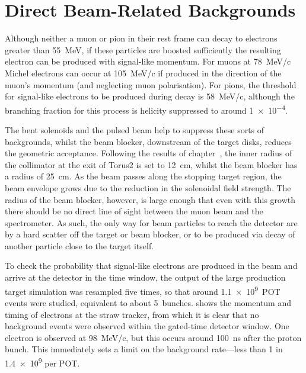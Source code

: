 \section{Direct Beam-Related Backgrounds}
Although neither a muon or pion in their rest frame can decay to electrons greater than 55~MeV, if these particles are boosted sufficiently the resulting electron can be produced with signal-like momentum.
For muons at 78~MeV/c Michel electrons can occur at 105~MeV/c if produced in the direction of the muon's momentum (and neglecting muon polarisation).
For pions, the threshold for signal-like electrons to be produced during decay is 58~MeV/c, although the branching fraction for this process is helicity suppressed to around \num{1e-4}.

The bent solenoids and the pulsed beam help to suppress these sorts of backgrounds, whilst the beam blocker, downstream of the target disks, reduces the geometric acceptance.
Following the results of chapter~, the inner radius of the collimator at the exit of Torus2 is set to 12~cm, whilst the beam blocker has a radius of 25~cm. 
As the beam passes along the stopping target region, the beam envelope grows due to the reduction in the solenoidal field strength.
The radius of the beam blocker, however, is large enough that even with this growth there should be no direct line of sight between the muon beam and the spectrometer.
As such, the only way for beam particles to reach the detector are by a hard scatter off the target or beam blocker, or to be produced via decay of another particle close to the target itself.

To check the probability that signal-like electrons are produced in the beam and arrive at the detector in the time window,
the output of the large production target simulation was resampled five times, so that around \num{1.1e9}~\ac{POT} events were studied, equivalent to about 5~\phaseII bunches.
 shows the momentum and timing of electrons at the straw tracker, from which it is clear that no background events were observed within the gated-time detector window.
One electron is observed at 98~MeV/c, but this occurs around 100~ns after the proton bunch.
This immediately sets a limit on the background rate---less than 1 in \num{1.4e9} per POT.
\FigBgBeamMomVsTime

